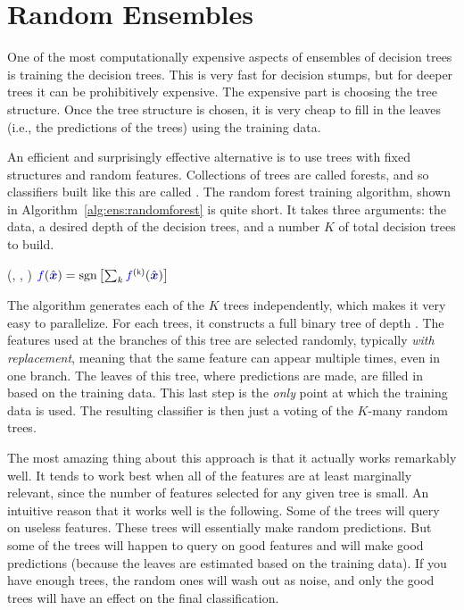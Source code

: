 \section{Random Ensembles}

One of the most computationally expensive aspects of ensembles of
decision trees is training the decision trees.  This is very fast for
decision stumps, but for deeper trees it can be prohibitively
expensive.  The expensive part is choosing the tree structure.  Once
the tree structure is chosen, it is very cheap to fill in the leaves
(i.e., the predictions of the trees) using the training data.

An efficient and surprisingly effective alternative is to use trees
with fixed structures and random features.  Collections of trees are
called forests, and so classifiers built like this are called
.  The random forest training algorithm, shown
in Algorithm~\ref{alg:ens:randomforest} is quite short.  It takes
three arguments: the data, a desired depth of the decision trees, and
a number $K$ of total decision trees to build.

%
  {(\VAR{$\cD$}, , )}%
  {
\ENDFOR
\RETURN $\FUNm{f}(\VARm{\hat \vx}) = \sgn\left[ \sum_k \FUNm{f\kth}(\VARm{\hat\vx}) \right]$
}

The algorithm generates each of the $K$ trees independently, which
makes it very easy to parallelize.  For each trees, it constructs a
full binary tree of depth .  The features used at the
branches of this tree are selected randomly, typically \emph{with
  replacement}, meaning that the same feature can appear multiple
times, even in one branch.  The leaves of this tree, where predictions
are made, are filled in based on the training data.  This last step is
the \emph{only} point at which the training data is used.  The
resulting classifier is then just a voting of the $K$-many random
trees.

The most amazing thing about this approach is that it actually works
remarkably well.  It tends to work best when all of the features are
at least marginally relevant, since the number of features selected
for any given tree is small.  An intuitive reason that it works well
is the following.  Some of the trees will query on useless features.
These trees will essentially make random predictions.  But some of the
trees will happen to query on good features and will make good
predictions (because the leaves are estimated based on the training
data).  If you have enough trees, the random ones will wash out as
noise, and only the good trees will have an effect on the final
classification.




